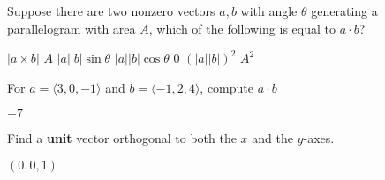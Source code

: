 \documentclass[addpoints]{exam}
\begin{document}
\printanswers
\begin{questions}
\question[10] Suppose there are two nonzero vectors $a,b$ with angle $\theta$ generating a parallelogram with area $A$, which of the following is equal to $a \cdot b$? 

\begin{oneparchoices}
\choice $|a \times b|$
\choice $A$
\choice $|a||b| \sin \theta$
\CorrectChoice $|a||b| \cos \theta$ 
\choice $0$
\choice $(|a||b|)^2$
\choice $A^2$
\end{oneparchoices} 

\question[25] For $a = \langle 3,0,-1 \rangle$ and $b = \langle -1, 2, 4 \rangle$, compute $a \cdot b$
\begin{solution}
$-7$
\end{solution}
\question[25] Find a {\bf unit} vector orthogonal to both the $x$ and the $y$-axes.
\begin{solution}
$(0,0,1)$
\end{solution}

\end{questions}
\end{document}
